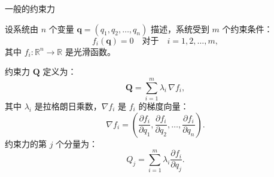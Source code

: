 \documentclass[12pt, a4paper, oneside, UTF8]{ctexbook}  %
\begin{document}
\begin{defn}
    一般的约束力

    设系统由 \( n \) 个变量 \( \mathbf{q} = (q_1, q_2, \dots, q_n) \) 描述，系统受到 \( m \) 个约束条件：
    \[
    f_i(\mathbf{q}) = 0 \quad \text{对于} \quad i = 1, 2, \dots, m,
    \]
    其中 \( f_i: \mathbb{R}^n \to \mathbb{R} \) 是光滑函数。
    
    约束力 \( \mathbf{Q} \) 定义为：
    \[
    \mathbf{Q} = \sum_{i=1}^m \lambda_i \, \nabla f_i,
    \]
    其中 \( \lambda_i \) 是拉格朗日乘数，\( \nabla f_i \) 是 \( f_i \) 的梯度向量：
    \[
    \nabla f_i = \left( \frac{\partial f_i}{\partial q_1}, \frac{\partial f_i}{\partial q_2}, \dots, \frac{\partial f_i}{\partial q_n} \right).
    \]
    约束力的第 \( j \) 个分量为：
    \[
    Q_j = \sum_{i=1}^m \lambda_i \frac{\partial f_i}{\partial q_j}.
    \]
\end{defn}
\end{document}
